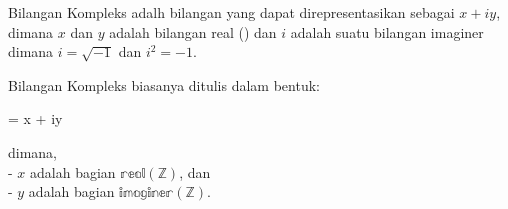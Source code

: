 \documentclass{article}
\begin{document}
    Bilangan Kompleks adalh bilangan yang dapat direpresentasikan sebagai \( x + iy\), dimana $x$ dan $y$ adalah bilangan real () dan $i$ adalah suatu bilangan imaginer dimana \(i = \sqrt{-1}\) dan \(i^2 = -1\).

    Bilangan Kompleks biasanya ditulis dalam bentuk:
    \begin{center}
         = x + iy
    \end{center}
    dimana,\\
    - $x$ adalah bagian \(\mathbb{real}(\mathbb{Z} ) \), dan\\
    - $y$ adalah bagian \(\mathbb{imaginer}(\mathbb{Z} ) \).
\end{document}
